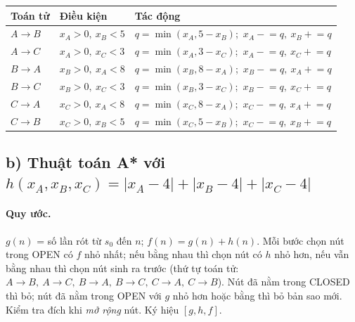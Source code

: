 \documentclass[a4paper,11pt]{article}
\newcommand{\cm}{,\allowbreak\ }
\newcommand{\sm}{;\allowbreak\ }
\newcommand{\ghf}[3]{[#1,#2,#3]}
\begin{document}
\begin{center}
\begin{tabular}{@{}lll@{}}
\toprule
Toán tử & Điều kiện & Tác động \\
\midrule
$A\to B$ & $x_A>0\cm x_B<5$ & $q=\min(x_A,5-x_B)$\sm $x_A\mathrel{-}=q\cm x_B\mathrel{+}=q$ \\
$A\to C$ & $x_A>0\cm x_C<3$ & $q=\min(x_A,3-x_C)$\sm $x_A\mathrel{-}=q\cm x_C\mathrel{+}=q$ \\
$B\to A$ & $x_B>0\cm x_A<8$ & $q=\min(x_B,8-x_A)$\sm $x_B\mathrel{-}=q\cm x_A\mathrel{+}=q$ \\
$B\to C$ & $x_B>0\cm x_C<3$ & $q=\min(x_B,3-x_C)$\sm $x_B\mathrel{-}=q\cm x_C\mathrel{+}=q$ \\
$C\to A$ & $x_C>0\cm x_A<8$ & $q=\min(x_C,8-x_A)$\sm $x_C\mathrel{-}=q\cm x_A\mathrel{+}=q$ \\
$C\to B$ & $x_C>0\cm x_B<5$ & $q=\min(x_C,5-x_B)$\sm $x_C\mathrel{-}=q\cm x_B\mathrel{+}=q$ \\
\bottomrule
\end{tabular}
\end{center}

\subsection*{b) Thuật toán A* với $h(x_A,x_B,x_C)=|x_A-4|+|x_B-4|+|x_C-4|$}

\paragraph{Quy ước.} $g(n)$ = số lần rót từ $s_0$ đến $n$; $f(n)=g(n)+h(n)$. Mỗi bước chọn nút trong OPEN có $f$ nhỏ nhất; nếu bằng nhau thì chọn nút có $h$ nhỏ hơn, nếu vẫn bằng nhau thì chọn nút sinh ra trước (thứ tự toán tử: $A\!\to\! B\cm A\!\to\! C\cm B\!\to\! A\cm B\!\to\! C\cm C\!\to\! A\cm C\!\to\! B$). Nút đã nằm trong CLOSED thì bỏ; nút đã nằm trong OPEN với $g$ nhỏ hơn hoặc bằng thì bỏ bản sao mới. Kiểm tra đích khi \emph{mở rộng} nút. Ký hiệu $\ghf{g}{h}{f}$.
\end{document}
